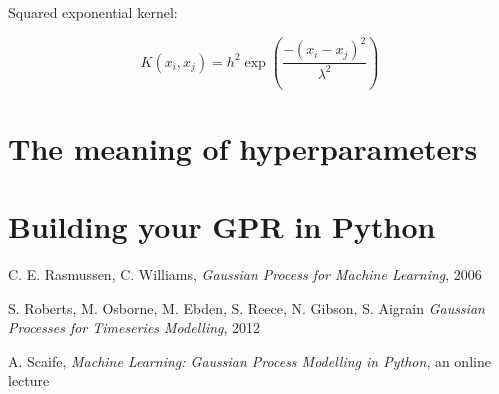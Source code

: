 \documentclass[10pt,twocolumn]{article}
\begin{document}
Squared exponential kernel:

\begin{equation}
K(x_i, x_j) = h^2 \exp(\frac{- (x_i - x_j)^2}{\lambda^2})
\end{equation}


\section{The meaning of hyperparameters}



\section{Building your GPR in Python}











\thebibliography{}

 C. E. Rasmussen, C. Williams, \textit{Gaussian Process for Machine Learning}, 2006

 S. Roberts, M. Osborne, M. Ebden, S. Reece, N. Gibson, S. Aigrain \textit{Gaussian Processes for Timeseries Modelling}, 2012

 A. Scaife, \textit{Machine Learning: Gaussian Process Modelling in Python}, an online lecture



 \label{bib:pope}
\end{document}
